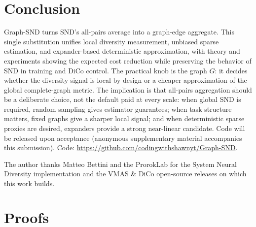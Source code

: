 \documentclass{article}
\makeatletter
\theoremstyle{plain}
\theoremstyle{definition}
\theoremstyle{remark}
\newcommand{\codelocation}{%
  \if@anonymous
    Code will be released upon acceptance (anonymous supplementary
    material accompanies this submission).%
  \else
    Code: \url{https://github.com/codingwithshawnyt/Graph-SND}.%
  \fi
}
\makeatother
\begin{document}
\section{Conclusion}
\label{sec:conclusion}

Graph-SND turns SND's all-pairs average into a graph-edge aggregate. This
single substitution unifies local diversity measurement, unbiased sparse
estimation, and expander-based deterministic approximation, with theory
and experiments showing the expected cost reduction while preserving the
behavior of SND in training and DiCo control. The practical knob is the
graph $G$: it decides whether the diversity signal is local by design or
a cheaper approximation of the global complete-graph metric.
The implication is that all-pairs aggregation should be a deliberate
choice, not the default paid at every scale: when global SND is required,
random sampling gives estimator guarantees; when task structure matters,
fixed graphs give a sharper local signal; and when deterministic sparse
proxies are desired, expanders provide a strong near-linear candidate.
\codelocation

\clearpage



\begin{ack}
The author thanks Matteo Bettini and the ProrokLab for the System
Neural Diversity implementation and the VMAS \& DiCo open-source
releases on which this work builds.
\end{ack}

\appendix
\section{Proofs}
\label{app:proofs}
\end{document}
